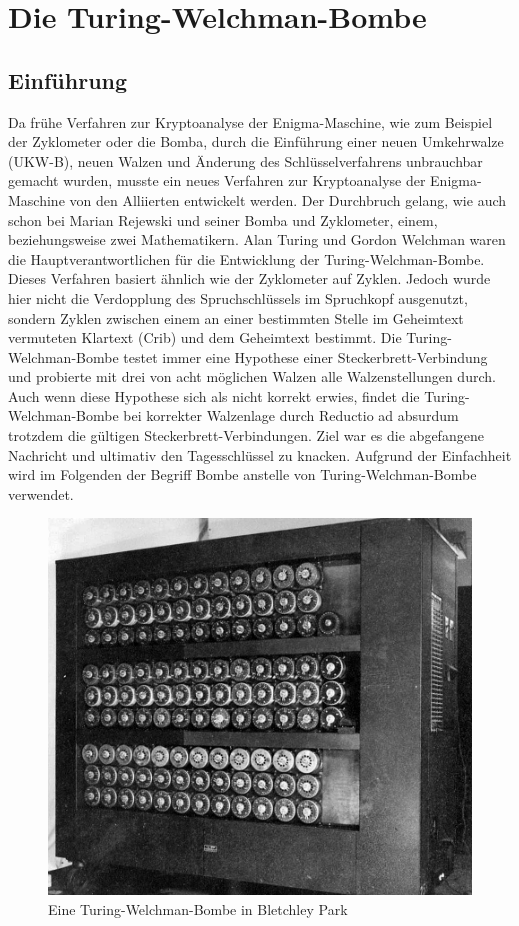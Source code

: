 \chapter{Die Turing-Welchman-Bombe}\label{ch:die-turing-bombe}

\section{Einführung}\label{sec:einfuerung_bombe}

Da frühe Verfahren zur Kryptoanalyse der Enigma-Maschine, wie zum Beispiel der \glqq Zyklometer\grqq{} oder die \glqq Bomba\grqq{}, durch die Einführung einer neuen Umkehrwalze (UKW-B), neuen Walzen und Änderung des Schlüsselverfahrens unbrauchbar gemacht wurden, musste ein neues Verfahren zur Kryptoanalyse der Enigma-Maschine von den Alliierten entwickelt werden. 
Der Durchbruch gelang, wie auch schon bei Marian Rejewski und seiner Bomba und Zyklometer, einem, beziehungsweise zwei Mathematikern.
Alan Turing und Gordon Welchman waren die Hauptverantwortlichen für die Entwicklung der \glqq Turing-Welchman-Bombe\grqq.
Dieses Verfahren basiert ähnlich wie der Zyklometer auf \glqq Zyklen\grqq.
Jedoch wurde hier nicht die Verdopplung des Spruchschlüssels im Spruchkopf ausgenutzt, sondern Zyklen zwischen einem an einer bestimmten Stelle im Geheimtext vermuteten Klartext (Crib) und dem Geheimtext bestimmt.
Die Turing-Welchman-Bombe testet immer eine Hypothese einer Steckerbrett-Verbindung und probierte mit drei von acht möglichen Walzen alle Walzenstellungen durch.
Auch wenn diese Hypothese sich als nicht korrekt erwies, findet die Turing-Welchman-Bombe bei korrekter Walzenlage durch Reductio ad absurdum trotzdem die gültigen Steckerbrett-Verbindungen.
Ziel war es die abgefangene Nachricht und ultimativ den Tagesschlüssel zu knacken.
Aufgrund der Einfachheit wird im Folgenden der Begriff \glqq Bombe\grqq{} anstelle von \glqq Turing-Welchman-Bombe\grqq{} verwendet.
\nopagebreak
\begin{figure}
	\centering
	\includegraphics[width=0.4\linewidth]{Turing Bomb/BletchleyParkBombe}
	\caption{Eine Turing-Welchman-Bombe in Bletchley Park\autocite{wiki:bombe_picture}}
	\label{fig:bombe}
\end{figure}

